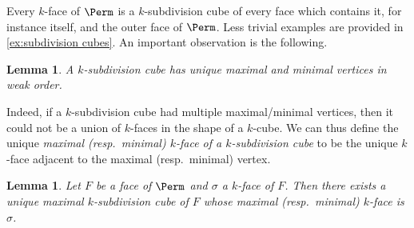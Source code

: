 \documentclass{amsart}
\newcommand{\darkblue}{\color{darkblue}} %
\newtheorem{lemma}[theorem]{Lemma}
\theoremstyle{definition}
\newcommand{\resp}{resp.~} %
\newcommand{\defn}[1]{\textsl{\darkblue #1}} %
\begin{document}
Every $k$-face of $\Perm$ is a $k$-subdivision cube of every face which contains it, for instance itself, and the outer face of $\Perm$.
Less trivial examples are provided in \cref{ex:subdivision cubes}.
An important observation is the following. 

\begin{lemma}
\label{lem:k-subdiv cubes have max/min k faces}
A $k$-subdivision cube has unique maximal and minimal vertices in weak order.
\end{lemma}

Indeed, if a $k$-subdivision cube had multiple maximal/minimal vertices, then it could not be a union of $k$-faces in the shape of a $k$-cube.
We can thus define the unique \defn{maximal (\resp minimal) $k$-face of a $k$-subdivision cube} to be the unique $k$-face adjacent to the maximal (\resp minimal) vertex.

\begin{lemma}
\label{lem:Unique maximal subdivcubes}
Let $F$ be a face of $\Perm$ and $\sigma$ a $k$-face of $F$. 
Then there exists a unique maximal $k$-subdivision cube of $F$ whose maximal (\resp minimal) $k$-face is $\sigma$.
\end{lemma}
\end{document}
